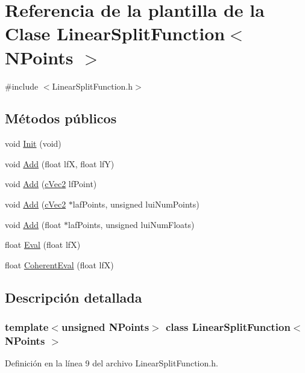 \hypertarget{class_linear_split_function}{
\section{Referencia de la plantilla de la Clase LinearSplitFunction$<$ NPoints $>$}
\label{class_linear_split_function}
}


{\ttfamily \#include $<$LinearSplitFunction.h$>$}

\subsection*{Métodos públicos}
\begin{DoxyCompactItemize}
\item 
void \hyperlink{class_linear_split_function_acf02ce0cabe58189cbea47c03e468c57}{Init} (void)
\item 
void \hyperlink{class_linear_split_function_abec17acb5ee65d4ea0c4c07d269c1354}{Add} (float lfX, float lfY)
\item 
void \hyperlink{class_linear_split_function_a07304e4b330734898dfa75a7a32dfba8}{Add} (\hyperlink{structc_vec2}{cVec2} lfPoint)
\item 
void \hyperlink{class_linear_split_function_a5ea10194a4be6d3f6a138eaeb2499d1b}{Add} (\hyperlink{structc_vec2}{cVec2} $\ast$lafPoints, unsigned luiNumPoints)
\item 
void \hyperlink{class_linear_split_function_aa84e69579d2a5317d26458dc0cda5373}{Add} (float $\ast$lafPoints, unsigned luiNumFloats)
\item 
float \hyperlink{class_linear_split_function_ad013823a7004d6ed710feab0570cdcb1}{Eval} (float lfX)
\item 
float \hyperlink{class_linear_split_function_ac3ea5d15dbb6b961d31646107ca8b4c9}{CoherentEval} (float lfX)
\end{DoxyCompactItemize}


\subsection{Descripción detallada}
\subsubsection*{template$<$unsigned NPoints$>$ class LinearSplitFunction$<$ NPoints $>$}



Definición en la línea 9 del archivo LinearSplitFunction.h.



